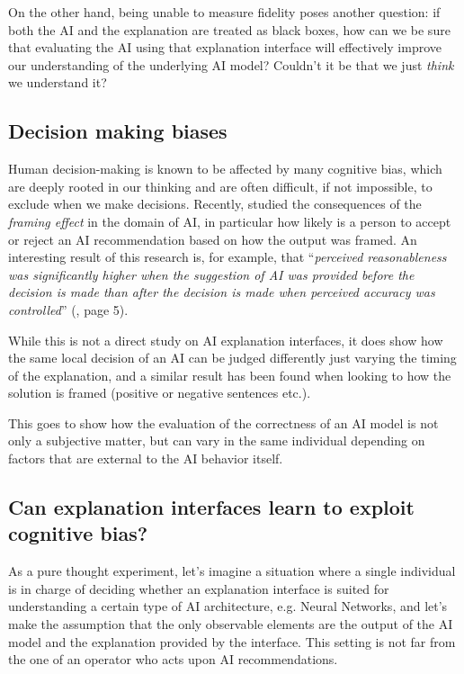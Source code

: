 \documentclass[conference]{IEEEtran}
\begin{document}
On the other hand, being unable to measure fidelity poses another question: if
both the AI and the explanation are treated as black boxes, how can we be sure
that evaluating the AI using that explanation interface will effectively improve
our understanding of the underlying AI model? Couldn't it be that we just
\textit{think} we understand it?

\subsection{Decision making biases}
\label{sec:bias}

Human decision-making is known to be affected by many cognitive bias, which are
deeply rooted in our thinking and are often difficult, if not impossible, to
exclude when we make decisions. Recently, \cite{framingeffect} studied the
consequences of the \textit{framing effect} in the domain of AI, in particular
how likely is a person to accept or reject an AI recommendation based on how the
output was framed. An interesting result of this research is, for example, that
``\textit{perceived reasonableness was significantly higher when the suggestion
    of AI was provided before the decision is made than after the decision is made
    when perceived accuracy was controlled}'' (\cite{framingeffect}, page 5).

While this is not a direct study on AI explanation interfaces, it does show how
the same local decision of an AI can be judged differently just varying the
timing of the explanation, and a similar result has been found when looking to
how the solution is framed (positive or negative sentences etc.).

This goes to show how the evaluation of the correctness of an AI model is not
only a subjective matter, but can vary in the same individual depending on
factors that are external to the AI behavior itself.

\subsection{Can explanation interfaces learn to exploit cognitive bias?}
\label{sec:exploit}

As a pure thought experiment, let's imagine a situation where a single
individual is in charge of deciding whether an explanation interface is suited
for understanding a certain type of AI architecture, e.g. Neural Networks, and
let's make the assumption that the only observable elements are the output of
the AI model and the explanation provided by the interface. This setting is not
far from the one of an operator who acts upon AI recommendations.
\end{document}
